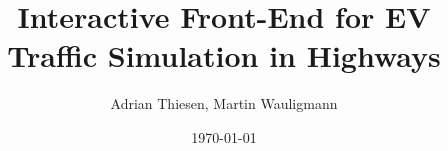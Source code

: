 


\graphicspath{ {graphics/} }

\usepackage[outputdir=build/output]{minted}

\usepackage{etoolbox}




\usepackage[T1]{fontenc}
\usepackage[scaled=0.9]{beramono}

\usepackage{fixltx2e}

\usepackage{hyperref}

\setlength{\footnotesep}{0.8\baselineskip}



\newcommand{\Thema}{Interactive Front-End for EV Traffic Simulation in Highways}
\newcommand{\Author}{Adrian Thiesen, Martin Wauligmann}
\newcommand{\Date}{\today}

\title{\Thema}
\author{\Author}
\date{\today}



\tableofcontents



\cleardoublepage
{}
\listoffigures

\renewcommand\bibname{References}

\cleardoublepage
{}



